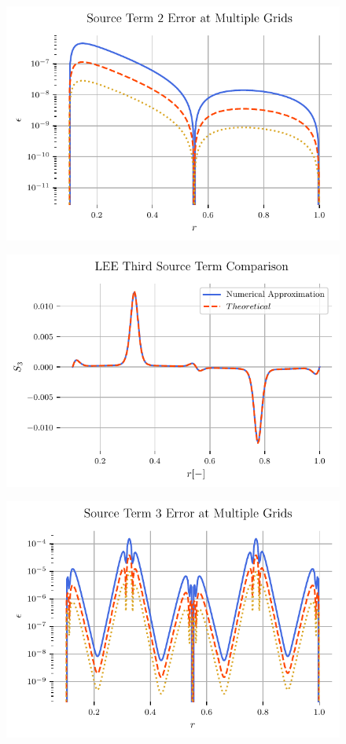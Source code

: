 \documentclass{article}
\begin{document}
\begin{figure}
    \centering
    \includegraphics[width=\textwidth]{tex-outputs/SourceTermError2.pdf}
\end{figure}

\begin{figure}
    \centering
    \includegraphics[width=\textwidth]{tex-outputs/SourceTermComparison3.pdf}
\end{figure}

\begin{figure}
    \centering
    \includegraphics[width=\textwidth]{tex-outputs/SourceTermError3.pdf}
\end{figure}
\end{document}
